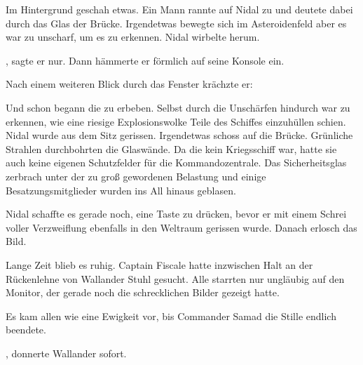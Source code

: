 \par

Im Hintergrund geschah etwas. Ein Mann rannte auf Nidal zu und deutete dabei durch das Glas der Brücke. Irgendetwas bewegte sich im Asteroidenfeld aber es war zu unscharf, um es zu erkennen. Nidal wirbelte herum.

\par

, sagte er nur. Dann hämmerte er förmlich auf seine Konsole ein. 

\par

Nach einem weiteren Blick durch das Fenster krächzte er: 

\par

Und schon begann die  zu erbeben. Selbst durch die Unschärfen hindurch war zu erkennen, wie eine riesige Explosionswolke Teile des Schiffes einzuhüllen schien. Nidal wurde aus dem Sitz gerissen. Irgendetwas schoss auf die Brücke. Grünliche Strahlen durchbohrten die Glaswände. Da die  kein Kriegsschiff war, hatte sie auch keine eigenen Schutzfelder für die Kommandozentrale. Das Sicherheitsglas zerbrach unter der zu groß gewordenen Belastung und einige Besatzungsmitglieder wurden ins All hinaus geblasen.

\par

Nidal schaffte es gerade noch, eine Taste zu drücken, bevor er mit einem Schrei voller Verzweiflung ebenfalls in den Weltraum gerissen wurde. Danach erlosch das Bild.

\par

Lange Zeit blieb es ruhig. Captain Fiscale hatte inzwischen Halt an der Rückenlehne von Wallander Stuhl gesucht. Alle starrten nur ungläubig auf den Monitor, der gerade noch die schrecklichen Bilder gezeigt hatte.

\par

Es kam allen wie eine Ewigkeit vor, bis Commander Samad die Stille endlich beendete. 

\par

, donnerte Wallander sofort. 

